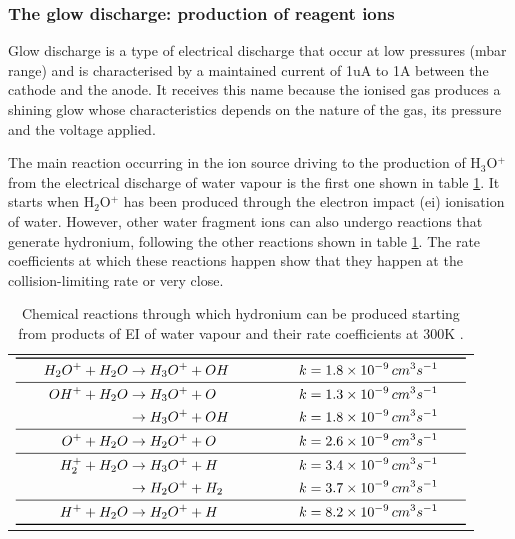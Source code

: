 \subsubsection{The glow discharge: production of reagent ions}
Glow discharge is a type of electrical discharge that occur at low pressures (mbar range) and is characterised by a maintained current of 1uA to 1A between the cathode and the anode. It receives this name because the ionised gas produces a shining glow whose characteristics depends on the nature of the gas, its pressure and the voltage applied.

The main reaction occurring in the ion source driving to the production of H$_3$O$^+$ from the electrical discharge of water vapour is the first one shown in table \ref{tb:reactions}. It starts when H$_2$O$^+$ has been produced through the electron impact (\acrshort{ei}) ionisation of water. However, other water fragment ions can also undergo reactions that generate hydronium, following the other reactions shown in table \ref{tb:reactions}. The rate coefficients at which these reactions happen show that they happen at the collision-limiting rate or very close.


\begin{table}[ht]
\centering
\caption{Chemical reactions through which hydronium can be produced starting from products of EI of water vapour and their rate coefficients at 300K \cite{doi:10.1002/rcm.1290030312}.}
\label{tb:reactions}
\begin{tabular}{ l l l }
\multicolumn{3}{l}{
$\begin{aligned}\toprule
\qquad H_2O^+ + H_2O 	&\rightarrow H_3O^+ + OH \qquad \qquad	& k = 1.8\times10^{-9}\, cm^{3}s^{-1} \qquad \\ \midrule 
OH^+ + H_2O  	&\rightarrow H_3O^+ + O  		& k = 1.3\times10^{-9}\,cm^{3}s^{-1} \qquad \\  
				&\rightarrow H_3O^+ + OH		& k = 1.8\times10^{-9}\,cm^{3}s^{-1}	 \qquad \\ \midrule
O^+ + H_2O  	&\rightarrow H_2O^+ + O  		& k = 2.6\times10^{-9}\, cm^{3}s^{-1}  \qquad \\ \midrule
H_2^+ + H_2O  	&\rightarrow H_3O^+ + H  		& k = 3.4\times10^{-9}\, cm^{3}s^{-1}  \qquad \\ 
				&\rightarrow H_2O^+ + H_2 		& k = 3.7\times10^{-9}\, cm^{3}s^{-1}	 \qquad \\ \midrule
H^+ + H_2O  	&\rightarrow H_2O^+ + H  		& k = 8.2\times10^{-9}\, cm^{3}s^{-1}  \qquad \\ \bottomrule
\end{aligned}$
} \\

\end{tabular}
\end{table}


